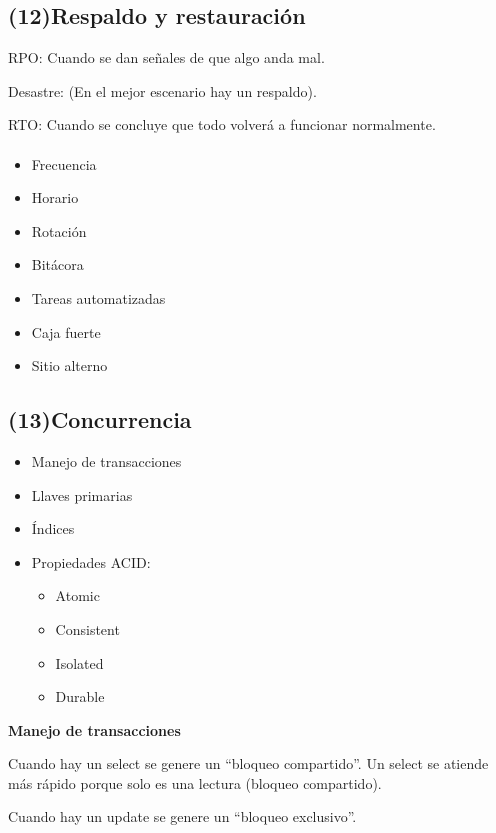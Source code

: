 \documentclass{article}
\begin{document}
\subsection{(12)Respaldo y restauración}

RPO: Cuando se dan señales de que algo anda mal.

Desastre: (En el mejor escenario hay un respaldo).

RTO: Cuando se concluye que todo volverá a funcionar normalmente.


\paragraph{}
\begin{itemize}
	\item
	Frecuencia
	\item
	Horario
	\item
	Rotación
	\item
	Bitácora
	\item
	Tareas automatizadas
	\item
	Caja fuerte
	\item
	Sitio alterno
\end{itemize}

\subsection{(13)Concurrencia}

\begin{itemize}
	\item
	Manejo de transacciones
	\item
	Llaves primarias
	\item
	Índices
	\item
	Propiedades ACID:
		\begin{itemize}
		\item
		Atomic
		\item
		Consistent
		\item
		Isolated
		\item
		Durable
		\end{itemize}
\end{itemize}

\textbf{Manejo de transacciones}
\vspace{1em}

Cuando hay un select se genere un ``bloqueo compartido''.
Un select se atiende más rápido porque solo es una lectura (bloqueo compartido).

Cuando hay un update se genere un ``bloqueo exclusivo''.
\end{document}
